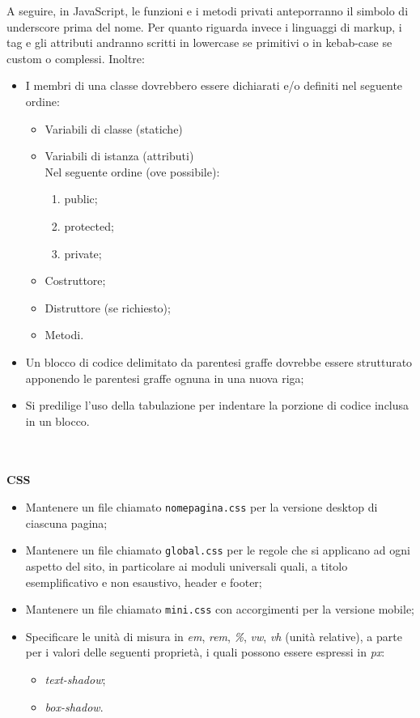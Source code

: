 \documentclass[a4paper, 12pt]{article}
\begin{document}
\vspace*{0.5cm}
A seguire, in JavaScript, le funzioni e i metodi privati anteporranno il simbolo di underscore prima del nome.\newline
Per quanto riguarda invece i linguaggi di markup, i tag e gli attributi andranno scritti in lowercase se primitivi o in kebab-case se custom o complessi. \newline
Inoltre:
\begin{itemize}
    \item I membri di una classe dovrebbero essere dichiarati e/o definiti nel seguente ordine:
    \begin{itemize}
        \item Variabili di classe (statiche)
        \item Variabili di istanza (attributi) \\
        Nel seguente ordine (ove possibile):
        \begin{enumerate}
            \item public;
            \item protected;
            \item private;
        \end{enumerate}
        \item Costruttore;
        \item Distruttore (se richiesto);
        \item Metodi.
    \end{itemize}
    \item Un blocco di codice delimitato da parentesi graffe dovrebbe essere strutturato apponendo le parentesi graffe ognuna in una nuova riga;
    \item Si predilige l'uso della tabulazione per indentare la porzione di codice inclusa in un blocco.
\paragraph{}\\
\end{itemize}
\textbf{CSS}
\begin{itemize}
    \item Mantenere un file chiamato \texttt{nomepagina.css} per la versione desktop di ciascuna pagina;
    \item Mantenere un file chiamato \texttt{global.css} per le regole che si applicano ad ogni aspetto del sito, in particolare ai moduli universali quali, a titolo esemplificativo e non esaustivo, header e footer;
    \item Mantenere un file chiamato \texttt{mini.css} con accorgimenti per la versione mobile;
    \item Specificare le unità di misura in \textit{em}, \textit{rem}, \textit{\%}, \textit{vw}, \textit{vh} (unità relative), a parte per i valori delle seguenti proprietà, i quali possono essere espressi in \textit{px}:
    \begin{itemize}
        \item \textit{text-shadow};
        \item \textit{box-shadow}.
    \end{itemize}
\end{itemize}
\newpage
\end{document}
